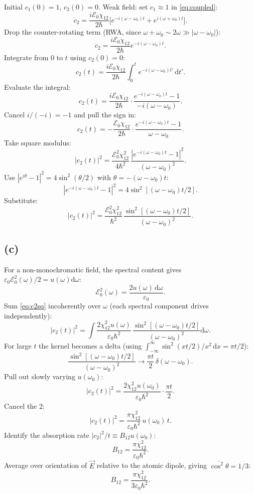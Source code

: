 \documentclass[11pt]{article}
\newcommand{\de}{\mathrm{d}}
\begin{document}
Initial $c_1(0)=1$, $c_2(0)=0$. Weak field: set $c_1\approx 1$ in \eqref{eq:coupled}:
\[
\dot c_2=\frac{i\mathcal E_0\chi_{12}}{2\hbar}\bigl[e^{-i(\omega-\omega_0)t}+e^{i(\omega+\omega_0)t}\bigr].
\]
Drop the counter-rotating term (RWA, since $\omega+\omega_0\sim 2\omega\gg|\omega-\omega_0|$):
\[
\dot c_2=\frac{i\mathcal E_0\chi_{12}}{2\hbar}e^{-i(\omega-\omega_0)t}.
\]
Integrate from $0$ to $t$ using $c_2(0)=0$:
\[
c_2(t)=\frac{i\mathcal E_0\chi_{12}}{2\hbar}\int_0^t e^{-i(\omega-\omega_0)t'}\,\de t'.
\]
Evaluate the integral:
\[
c_2(t)=\frac{i\mathcal E_0\chi_{12}}{2\hbar}\cdot\frac{e^{-i(\omega-\omega_0)t}-1}{-i(\omega-\omega_0)}.
\]
Cancel $i/(-i)=-1$ and pull the sign in:
\[
c_2(t)=-\frac{\mathcal E_0\chi_{12}}{2\hbar}\cdot\frac{e^{-i(\omega-\omega_0)t}-1}{\omega-\omega_0}.
\]
Take square modulus:
\[
|c_2(t)|^2=\frac{\mathcal E_0^2\chi_{12}^2}{4\hbar^2}\,\frac{|e^{-i(\omega-\omega_0)t}-1|^2}{(\omega-\omega_0)^2}.
\]
Use $|e^{i\theta}-1|^2=4\sin^2(\theta/2)$ with $\theta=-(\omega-\omega_0)t$:
\[
|e^{-i(\omega-\omega_0)t}-1|^2=4\sin^2[(\omega-\omega_0)t/2].
\]
Substitute:
\begin{equation}
\boxed{\;|c_2(t)|^2=\frac{\mathcal E_0^2\chi_{12}^2}{\hbar^2}\,\frac{\sin^2[(\omega-\omega_0)t/2]}{(\omega-\omega_0)^2}.\;}\label{eq:c2sq}
\end{equation}

\subsection*{(c)}

For a non-monochromatic field, the spectral content gives $\varepsilon_0\mathcal E_0^2(\omega)/2=u(\omega)\de\omega$:
\[
\mathcal E_0^2(\omega)=\frac{2u(\omega)\,\de\omega}{\varepsilon_0}.
\]
Sum \eqref{eq:c2sq} incoherently over $\omega$ (each spectral component drives independently):
\[
|c_2(t)|^2=\int\frac{2\chi_{12}^2 u(\omega)}{\varepsilon_0\hbar^2}\,\frac{\sin^2[(\omega-\omega_0)t/2]}{(\omega-\omega_0)^2}\de\omega.
\]
For large $t$ the kernel becomes a delta (using $\int_{-\infty}^\infty\sin^2(xt/2)/x^2\,\de x=\pi t/2$):
\[
\frac{\sin^2[(\omega-\omega_0)t/2]}{(\omega-\omega_0)^2}\to\frac{\pi t}{2}\,\delta(\omega-\omega_0).
\]
Pull out slowly varying $u(\omega_0)$:
\[
|c_2(t)|^2=\frac{2\chi_{12}^2 u(\omega_0)}{\varepsilon_0\hbar^2}\cdot\frac{\pi t}{2}.
\]
Cancel the 2:
\[
|c_2(t)|^2=\frac{\pi\chi_{12}^2}{\varepsilon_0\hbar^2}\,u(\omega_0)\,t.
\]
Identify the absorption rate $|c_2|^2/t\equiv B_{12}u(\omega_0)$:
\[
B_{12}=\frac{\pi\chi_{12}^2}{\varepsilon_0\hbar^2}.
\]
Average over orientation of $\vec E$ relative to the atomic dipole, giving $\overline{\cos^2\theta}=1/3$:
\begin{equation}
\boxed{\;B_{12}=\frac{\pi\chi_{12}^2}{3\varepsilon_0\hbar^2}.\;}\label{eq:B12}
\end{equation}
\end{document}
